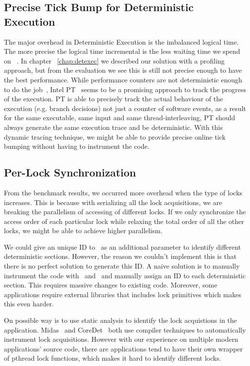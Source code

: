 \subsection{Precise Tick Bump for Deterministic Execution}
The major overhead in Deterministic Execution is the imbalanced logical time. The more precise the logical time incremental is the less waiting time we spend on \detstart\ . In chapter ~\ref{chap:detexec} we described our solution with a profiling approach, but from the evaluation we see this is still not precise enough to have the best performance. While performance counters are not deterministic enough to do the job~\cite{weaver2008can}, Intel PT~\cite{intelpt} seems to be a promising approach to track the progress of the execution. PT is able to precisely track the actual behaviour of the execution (e.g. branch decisions) not just a counter of software events, as a result for the same executable, same input and same thread-interleaving, PT should always generate the same execution trace and be deterministic. With this dynamic tracing technique, we might be able to provide precise online tick bumping without having to instrument the code.

\subsection{Per-Lock Synchronization}
From the benchmark results, we occurred more overhead when the type of locks increases. This is because with serializing all the lock acquisitions, we are breaking the parallelism of accessing of different locks. If we only synchronize the access order of each particular lock while relaxing the total order of all the other locks, we might be able to achieve higher parallelism.

We could give an unique ID to \detstart\ as an additional parameter to identify different deterministic sections. However, the reason we couldn't implement this is that there is no perfect solution to generate this ID. A naive solution is to manually instrument the code with \detstart\ and \detend\, and manually assign an ID to each deterministic section. This requires massive changes to existing code. Moreover, some applications require external libraries that includes lock primitives which makes this even harder.

On possible way is to use static analysis to identify the lock acquistions in the application. Midas~\cite{slember2006static} and CoreDet~\cite{bergan2010coredet} both use compiler techniques to automatically instrument lock acquisitions. However with our experience on multiple modern applications' source code, there are applications tend to have their own wrapper of pthread lock functions, which makes it hard to identify different locks.

